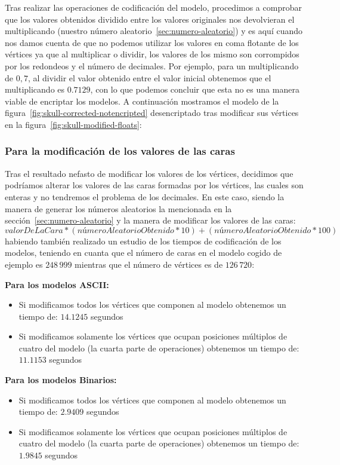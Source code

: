 Tras realizar las operaciones de codificación del modelo, procedimos a comprobar que los valores obtenidos dividido entre los valores originales nos devolvieran el multiplicando (nuestro número aleatorio~\ref{sec:numero-aleatorio}) y es aquí cuando nos damos cuenta de que no podemos utilizar los valores en coma flotante de los vértices ya que al multiplicar o dividir, los valores de los mismo son corrompidos por los redondeos y el número de decimales. Por ejemplo, para un multiplicando de $0,7$, al dividir el valor obtenido entre el valor inicial obtenemos que el multiplicando es $0.7129$, con lo que podemos concluir que esta no es una manera viable de encriptar los modelos. A continuación mostramos el modelo de la figura~\ref{fig:skull-corrected-notencripted} desencriptado tras modificar sus vértices en la figura~\ref{fig:skull-modified-floats}:

\subsubsection{Para la modificación de los valores de las caras}
Tras el resultado nefasto de modificar los valores de los vértices, decidimos que podríamos alterar los valores de las caras formadas por los vértices, las cuales son enteras y no tendremos el problema de los decimales. En este caso, siendo la manera de generar los números aleatorios la mencionada en la sección~\ref{sec:numero-aleatorio} y la manera de modificar los valores de las caras: \[ valor De La Cara * (número Aleatorio Obtenido * 10) + (número Aleatorio Obtenido * 100) \] habiendo también realizado un estudio de los tiempos de codificación de los modelos, teniendo en cuanta que el número de caras en el modelo cogido de ejemplo es $248\,999$ mientras que el número de vértices es de $126\,720$:

\textbf{Para los modelos ASCII:}
\begin{itemize}
	\item Si modificamos todos los vértices que componen al modelo obtenemos un tiempo de: $14.1245$ segundos
	\item Si modificamos solamente los vértices que ocupan posiciones múltiplos de cuatro del modelo (la cuarta parte de operaciones) obtenemos un tiempo de: $11.1153$ segundos
\end{itemize}

\textbf{Para los modelos Binarios:}
\begin{itemize}
	\item Si modificamos todos los vértices que componen al modelo obtenemos un tiempo de: $2.9409$ segundos
	\item Si modificamos solamente los vértices que ocupan posiciones múltiplos de cuatro del modelo (la cuarta parte de operaciones) obtenemos un tiempo de: $1.9845$ segundos
\end{itemize}

